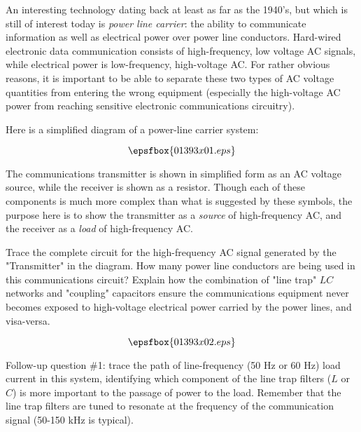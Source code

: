 

An interesting technology dating back at least as far as the 1940's, but which is still of interest today is {\it power line carrier}: the ability to communicate information as well as electrical power over power line conductors.  Hard-wired electronic data communication consists of high-frequency, low voltage AC signals, while electrical power is low-frequency, high-voltage AC.  For rather obvious reasons, it is important to be able to separate these two types of AC voltage quantities from entering the wrong equipment (especially the high-voltage AC power from reaching sensitive electronic communications circuitry).

Here is a simplified diagram of a power-line carrier system:

$$\epsfbox{01393x01.eps}$$

The communications transmitter is shown in simplified form as an AC voltage source, while the receiver is shown as a resistor.  Though each of these components is much more complex than what is suggested by these symbols, the purpose here is to show the transmitter as a {\it source} of high-frequency AC, and the receiver as a {\it load} of high-frequency AC.

Trace the complete circuit for the high-frequency AC signal generated by the "Transmitter" in the diagram.  How many power line conductors are being used in this communications circuit?  Explain how the combination of "line trap" $LC$ networks and "coupling" capacitors ensure the communications equipment never becomes exposed to high-voltage electrical power carried by the power lines, and visa-versa.







$$\epsfbox{01393x02.eps}$$

\vskip 10pt

Follow-up question \#1: trace the path of line-frequency (50 Hz or 60 Hz) load current in this system, identifying which component of the line trap filters ($L$ or $C$) is more important to the passage of power to the load.  Remember that the line trap filters are tuned to resonate at the frequency of the communication signal (50-150 kHz is typical).

